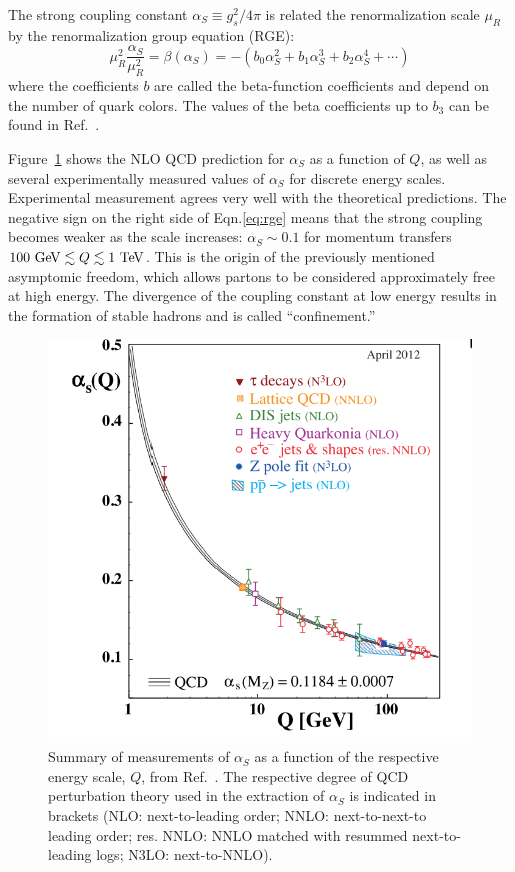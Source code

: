 The strong coupling constant $\alpha_S \equiv g_s^2/4\pi$ is related the renormalization scale $\mu_R$ by the renormalization group equation (RGE):
\begin{equation}
\mu_R^2 \frac{\alpha_S}{\mu^2_R} = \beta \left( \alpha_S \right) = -\left( b_0\alpha^2_S + b_1\alpha^3_S + b_2\alpha^4_S + \dotsb \right)
\label{eq:rge}
\end{equation}
where the coefficients $b$ are called the beta-function coefficients and depend on the number of quark colors. The values of the beta coefficients up to $b_3$ can be found in Ref.~\cite{vanRitbergen:1997va}. 

Figure~\ref{fig:alphas} shows the NLO QCD prediction for $\alpha_S$ as a function of $Q$, as well as several experimentally measured values of $\alpha_S$ for discrete energy scales. Experimental measurement agrees very well with the theoretical predictions. The negative sign on the right side of Eqn.\ref{eq:rge} means that the strong coupling becomes weaker as the scale increases: $\alpha_S \sim 0.1$ for momentum transfers $100 \gev \lesssim Q \lesssim 1 \tev$. This is the origin of the previously mentioned asymptomic freedom, which allows partons to be considered approximately free at high energy. The divergence of the coupling constant at low energy results in the formation of stable hadrons and is called ``confinement.''

\begin{figure}[h]
\includegraphics[width=\textwidth]{fig/thry/RunningAlpha.png}
\caption{Summary of measurements of $\alpha_S$ as a function of the respective energy scale, $Q$, from Ref.~\cite{PDG}. The respective degree of QCD perturbation theory used in the extraction
of $\alpha_S$ is indicated in brackets (NLO: next-to-leading order; NNLO: next-to-next-to leading order; res. NNLO: NNLO matched with resummed next-to-leading logs;
N3LO: next-to-NNLO).}
\label{fig:alphas}
\end{figure}
